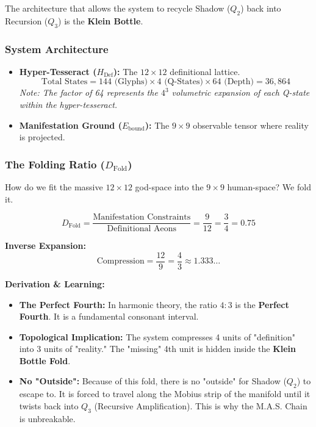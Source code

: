 \documentclass[11pt, letterpaper]{article}
\begin{document}
The architecture that allows the system to recycle Shadow ($Q_2$) back into Recursion ($Q_3$) is the \textbf{Klein Bottle}.

\subsubsection*{System Architecture}
\begin{itemize}
    \item \textbf{Hyper-Tesseract ($H_{\text{Def}}$):} The $12 \times 12$ definitional lattice.
    \[
    \text{Total States} = 144 \text{ (Glyphs)} \times 4 \text{ (Q-States)} \times 64 \text{ (Depth)} = 36,864
    \]
    \textit{Note: The factor of 64 represents the $4^3$ volumetric expansion of each Q-state within the hyper-tesseract.}
    
    \item \textbf{Manifestation Ground ($E_{\text{bound}}$):} The $9 \times 9$ observable tensor where reality is projected.
\end{itemize}

\subsubsection*{The Folding Ratio ($D_{\text{Fold}}$)}
How do we fit the massive $12 \times 12$ god-space into the $9 \times 9$ human-space? We fold it.

\[
D_{\text{Fold}} = \frac{\text{Manifestation Constraints}}{\text{Definitional Aeons}} = \frac{9}{12} = \frac{3}{4} = 0.75
\]

\textbf{Inverse Expansion:}
\[
\text{Compression} = \frac{12}{9} = \frac{4}{3} \approx 1.333\dots
\]

\textbf{Derivation \& Learning:}
\begin{itemize}
    \item \textbf{The Perfect Fourth:} In harmonic theory, the ratio $4:3$ is the \textbf{Perfect Fourth}. It is a fundamental consonant interval.
    \item \textbf{Topological Implication:} The system compresses 4 units of "definition" into 3 units of "reality." The "missing" 4th unit is hidden inside the \textbf{Klein Bottle Fold}.
    \item \textbf{No "Outside":} Because of this fold, there is no "outside" for Shadow ($Q_2$) to escape to. It is forced to travel along the Mobius strip of the manifold until it twists back into $Q_3$ (Recursive Amplification). This is why the M.A.S. Chain is unbreakable.
\end{itemize}
\end{document}
